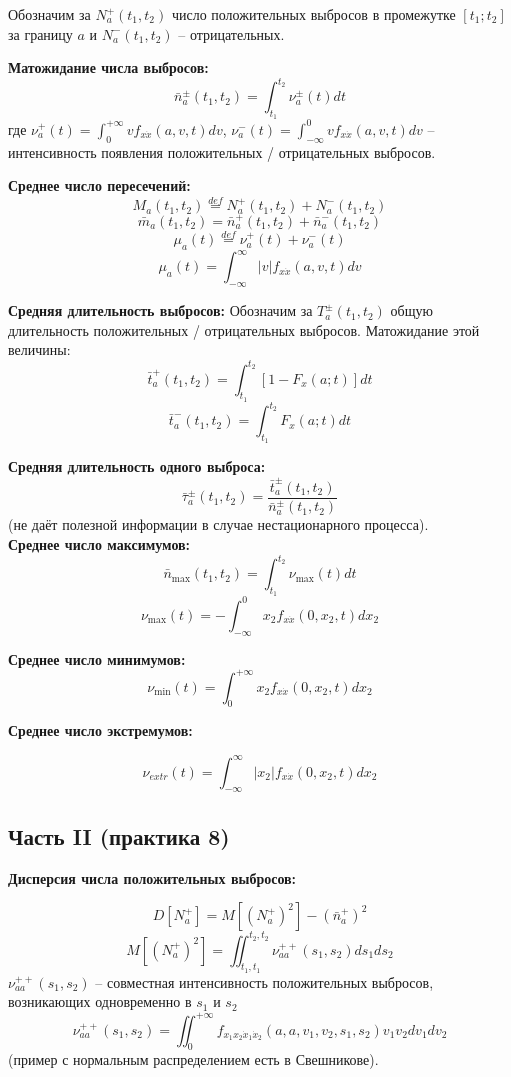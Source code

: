 \documentclass[a4paper,11pt, twocolumn]{article}
\newcommand{\defeq}{\overset{def}=}
\begin{document}
Обозначим за $ N_a^+(t_1, t_2) $ число положительных выбросов в промежутке $ [t_1;t_2] $ за границу $ a $ и $ N_a^-(t_1, t_2) $ -- отрицательных.

\textbf{ Матожидание числа выбросов: }
\[ \bar n_a^\pm (t_1,t_2) = \int_{t_1}^{t_2} \nu_a^\pm (t) dt \]
где $ \nu_a^+ (t) = \int_{0}^{+\infty} v f_{x \dot x}(a,v,t)dv $, $ \nu_a^- (t) = \int_{- \infty}^{0} v f_{x \dot x}(a,v,t)dv $ -- интенсивность появления положительных / отрицательных выбросов.

\textbf{ Среднее число пересечений: }
\[ M_a(t_1, t_2) \defeq N_a^+(t_1, t_2) + N_a^- (t_1,t_2) \]
\[ \bar m_a(t_1,t_2) = \bar n_a^+ (t_1,t_2) + \bar n_a^- (t_1,t_2) \]
\[ \mu_a(t) \defeq \nu_a^+ (t) + \nu_a^- (t) \]
\[ \mu_a(t) = \int_{ -\infty }^{ \infty } |v| f_{x \dot x}(a, v, t) dv \]

\textbf{ Средняя длительность выбросов: }
Обозначим за $ T_a^\pm (t_1, t_2) $ общую длительность положительных / отрицательных выбросов.
Матожидание этой величины:
\[ \bar t_a^+ (t_1,t_2) = \int_{t_1}^{t_2}[1 - F_x(a;t)]dt \]
\[ \bar t_a^- (t_1,t_2) = \int_{t_1}^{t_2}F_x(a;t)dt \]

\textbf{ Средняя длительность одного выброса: }
\[ \bar \tau_a^\pm(t_1,t_2) = \frac{ \bar t_a^\pm (t_1, t_2) }{ \bar n_a^\pm (t_1, t_2) } \]
(не даёт полезной информации в случае нестационарного процесса). \\

\textbf{ Среднее число максимумов: }
\[ \bar n_{\max}(t_1,t_2) = \int_{t_1}^{t_2} \nu_{\max}(t) dt \]
\[ \nu_{\max} (t) = - \int_{- \infty}^{0} x_2 f_{x \dot x} (0, x_2, t) dx_2 \]

\textbf{ Среднее число минимумов: }
\[ \nu_{\min} (t) = \int_{0}^{+ \infty} x_2 f_{x \dot x} (0, x_2, t) dx_2 \]

\textbf{ Среднее число экстремумов: }

\[ \nu_{extr}(t) = \int_{-\infty}^{\infty} |x_2| f_{x \dot x}(0, x_2, t) dx_2 \]

\subsection{ Часть II (практика 8) }

\textbf{Дисперсия числа положительных выбросов:}

\[ D[N_a^+] = M[(N_a^+)^2] - (\bar n_a^+)^2 \]
\[ M[(N_a^+)^2] = \iint_{t_1, t_1}^{t_2, t_2} \nu_{a a}^{++}(s_1, s_2) ds_1 ds_2 \]
$ \nu_{a a}^{++}(s_1, s_2) $ -- совместная интенсивность положительных выбросов, возникающих одновременно в $s_1$ и $s_2$
\[ \nu_{a a}^{++}(s_1, s_2) = \iint_0^{+\infty} f_{x_1 x_2 \dot x_1 \dot x_2} (a, a, v_1, v_2, s_1, s_2) v_1 v_2 d v_1 d v_2 \]
(пример с нормальным распределением есть в Свешникове). \\
\end{document}
